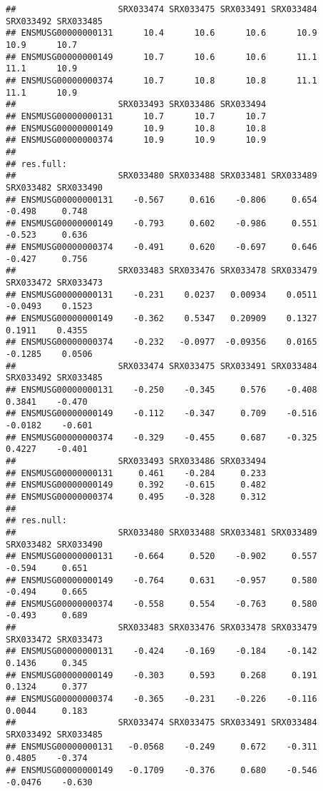 \documentclass[]{article}
\begin{document}
\begin{verbatim}
##                    SRX033474 SRX033475 SRX033491 SRX033484 SRX033492 SRX033485
## ENSMUSG00000000131      10.4      10.6      10.6      10.9      10.9      10.7
## ENSMUSG00000000149      10.7      10.6      10.6      11.1      11.1      10.9
## ENSMUSG00000000374      10.7      10.8      10.8      11.1      11.1      10.9
##                    SRX033493 SRX033486 SRX033494
## ENSMUSG00000000131      10.7      10.7      10.7
## ENSMUSG00000000149      10.9      10.8      10.8
## ENSMUSG00000000374      10.9      10.9      10.9
## 
## res.full: 
##                    SRX033480 SRX033488 SRX033481 SRX033489 SRX033482 SRX033490
## ENSMUSG00000000131    -0.567     0.616    -0.806     0.654    -0.498     0.748
## ENSMUSG00000000149    -0.793     0.602    -0.986     0.551    -0.523     0.636
## ENSMUSG00000000374    -0.491     0.620    -0.697     0.646    -0.427     0.756
##                    SRX033483 SRX033476 SRX033478 SRX033479 SRX033472 SRX033473
## ENSMUSG00000000131    -0.231    0.0237   0.00934    0.0511   -0.0493    0.1523
## ENSMUSG00000000149    -0.362    0.5347   0.20909    0.1327    0.1911    0.4355
## ENSMUSG00000000374    -0.232   -0.0977  -0.09356    0.0165   -0.1285    0.0506
##                    SRX033474 SRX033475 SRX033491 SRX033484 SRX033492 SRX033485
## ENSMUSG00000000131    -0.250    -0.345     0.576    -0.408    0.3841    -0.470
## ENSMUSG00000000149    -0.112    -0.347     0.709    -0.516   -0.0182    -0.601
## ENSMUSG00000000374    -0.329    -0.455     0.687    -0.325    0.4227    -0.401
##                    SRX033493 SRX033486 SRX033494
## ENSMUSG00000000131     0.461    -0.284     0.233
## ENSMUSG00000000149     0.392    -0.615     0.482
## ENSMUSG00000000374     0.495    -0.328     0.312
## 
## res.null: 
##                    SRX033480 SRX033488 SRX033481 SRX033489 SRX033482 SRX033490
## ENSMUSG00000000131    -0.664     0.520    -0.902     0.557    -0.594     0.651
## ENSMUSG00000000149    -0.764     0.631    -0.957     0.580    -0.494     0.665
## ENSMUSG00000000374    -0.558     0.554    -0.763     0.580    -0.493     0.689
##                    SRX033483 SRX033476 SRX033478 SRX033479 SRX033472 SRX033473
## ENSMUSG00000000131    -0.424    -0.169    -0.184    -0.142    0.1436     0.345
## ENSMUSG00000000149    -0.303     0.593     0.268     0.191    0.1324     0.377
## ENSMUSG00000000374    -0.365    -0.231    -0.226    -0.116    0.0044     0.183
##                    SRX033474 SRX033475 SRX033491 SRX033484 SRX033492 SRX033485
## ENSMUSG00000000131   -0.0568    -0.249     0.672    -0.311    0.4805    -0.374
## ENSMUSG00000000149   -0.1709    -0.376     0.680    -0.546   -0.0476    -0.630

\end{verbatim}
\end{document}
